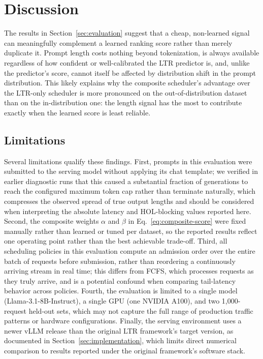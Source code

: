 \section{Discussion}
\label{sec:discussion}

The results in Section~\ref{sec:evaluation} suggest that a cheap, non-learned
signal can meaningfully complement a learned ranking score rather than merely
duplicate it. Prompt length costs nothing beyond tokenization, is always
available regardless of how confident or well-calibrated the LTR predictor
is, and, unlike the predictor's score, cannot itself be affected by
distribution shift in the prompt distribution. This likely explains why the
composite scheduler's advantage over the LTR-only scheduler is more
pronounced on the out-of-distribution dataset than on the in-distribution
one: the length signal has the most to contribute exactly when the learned
score is least reliable.

\subsection{Limitations}
\label{subsec:limitations}

Several limitations qualify these findings. First, prompts in this evaluation
were submitted to the serving model without applying its chat template; we
verified in earlier diagnostic runs that this caused a substantial fraction of
generations to reach the configured maximum token cap rather than terminate
naturally, which compresses the observed spread of true output lengths and
should be considered when interpreting the absolute latency and HOL-blocking
values reported here. Second, the composite weights $\alpha$ and $\beta$ in
Eq.~\eqref{eq:composite-score} were fixed manually rather than learned or
tuned per dataset, so the reported results reflect one operating point rather
than the best achievable trade-off. Third, all scheduling policies in this
evaluation compute an admission order over the entire batch of requests
before submission, rather than reordering a continuously arriving stream in
real time; this differs from FCFS, which processes requests as they truly
arrive, and is a potential confound when comparing tail-latency behavior
across policies. Fourth, the evaluation is limited to a single model
(Llama-3.1-8B-Instruct), a single GPU (one NVIDIA A100), and two
1{,}000-request held-out sets, which may not capture the full range of
production traffic patterns or hardware configurations. Finally, the serving
environment uses a newer vLLM release than the original LTR framework's
target version, as documented in Section~\ref{sec:implementation}, which
limits direct numerical comparison to results reported under the original
framework's software stack.

